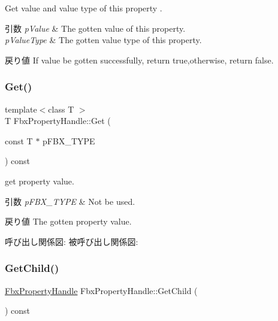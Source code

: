 Get value and value type of this property . 
\begin{DoxyParams}{引数}
{\em p\+Value} & The gotten value of this property. \\
\hline
{\em p\+Value\+Type} & The gotten value type of this property. \\
\hline
\end{DoxyParams}
\begin{DoxyReturn}{戻り値}
If value be gotten successfully, return true,otherwise, return false. 
\end{DoxyReturn}
\mbox{\label{class_fbx_property_handle_af67a0926e9905c19cc7b2a60b4d89adb}} 
\subsubsection{\texorpdfstring{Get()}{Get()}\hspace{0.1cm}{\footnotesize\ttfamily [2/2]}}
{\footnotesize\ttfamily template$<$class T $>$ \\
T Fbx\+Property\+Handle\+::\+Get (\begin{DoxyParamCaption}\item[{const T $\ast$}]{p\+F\+B\+X\+\_\+\+T\+Y\+PE }\end{DoxyParamCaption}) const}

get property value. 
\begin{DoxyParams}{引数}
{\em p\+F\+B\+X\+\_\+\+T\+Y\+PE} & Not be used. \\
\hline
\end{DoxyParams}
\begin{DoxyReturn}{戻り値}
The gotten property value. 
\end{DoxyReturn}
呼び出し関係図\+:
被呼び出し関係図\+:
\mbox{\label{class_fbx_property_handle_a6160671cde8bff49fe5552ea9bdde1cd}} 
\subsubsection{\texorpdfstring{Get\+Child()}{GetChild()}}
{\footnotesize\ttfamily \hyperlink{class_fbx_property_handle}{Fbx\+Property\+Handle} Fbx\+Property\+Handle\+::\+Get\+Child (\begin{DoxyParamCaption}{ }\end{DoxyParamCaption}) const}

